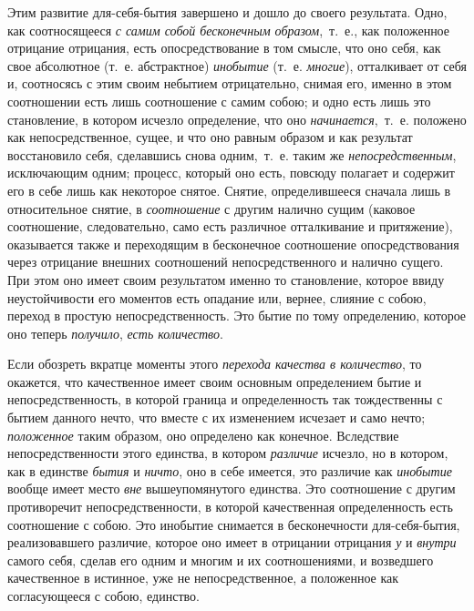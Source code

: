 Этим развитие для-себя-бытия завершено и дошло до своего результата. Одно,
как соотносящееся {\em с самим собой бесконечным
образом},~т.~е., как положенное отрицание отрицания, есть опосредствование
в том смысле, что оно себя, как свое абсолютное (т.~е. абстрактное)
{\em инобытие} (т.~е.
{\em многие}), отталкивает от себя и, соотносясь с этим
своим небытием отрицательно, снимая его, именно в этом соотношении есть
лишь соотношение с самим собою; и одно есть лишь это становление, в котором
исчезло определение, что оно {\em начинается},~т.~е.
положено как непосредственное, сущее, и что оно равным образом и как
результат восстановило себя, сделавшись снова одним,~т.~е. таким же
{\em непосредственным}, исключающим одним; процесс,
который оно есть, повсюду полагает и содержит его в себе лишь как некоторое
снятое. Снятие, определившееся сначала лишь в относительное снятие, в
{\em соотношение} с другим налично сущим (каковое
соотношение, следовательно, само есть различное отталкивание и
притяжение), оказывается также и переходящим в бесконечное соотношение
опосредствования через отрицание внешних соотношений непосредственного и
налично сущего. При этом оно имеет своим результатом именно то становление,
которое ввиду неустойчивости его моментов есть опадание или, вернее,
слияние с собою, переход в простую непосредственность. Это бытие по тому
определению, которое оно теперь {\em получило},
{\em есть количество}.

Если обозреть вкратце моменты этого {\em перехода
качества в количество}, то окажется, что качественное имеет своим основным
определением бытие и непосредственность, в которой граница и определенность
так тождественны с бытием данного нечто, что вместе с их изменением
исчезает и само нечто; {\em положенное} таким образом,
оно определено как конечное. Вследствие непосредственности этого единства,
в котором {\em различие} исчезло, но в котором, как в
единстве {\em бытия} и {\em ничто},
оно в себе имеется, это различие как {\em инобытие}
вообще имеет место {\em вне} вышеупомянутого единства.
Это соотношение с другим противоречит непосредственности, в которой
качественная определенность есть соотношение с собою. Это инобытие
снимается в бесконечности для-себя-бытия, реализовавшего различие, которое
оно имеет в отрицании отрицания {\em у} и
{\em внутри} самого себя, сделав его одним и многим и
их соотношениями, и возведшего качественное в истинное, уже не
непосредственное, а положенное как согласующееся с собою, единство.

